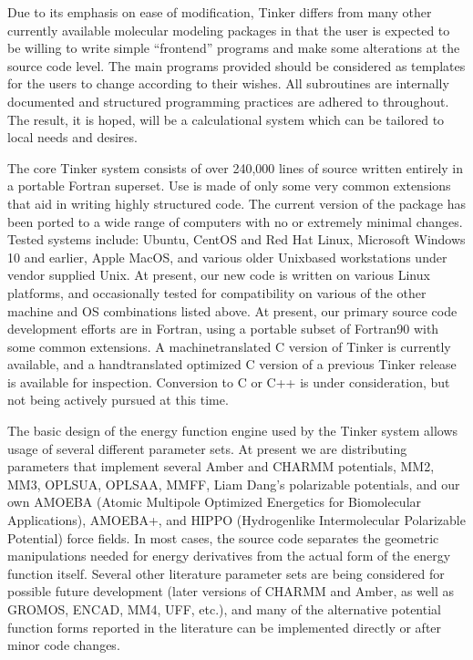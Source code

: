 \documentclass[letterpaper,11pt,english]{sphinxmanual}
\begin{document}
Due to its emphasis on ease of modification, Tinker differs from many other currently available molecular modeling packages in that the user is expected to be willing to write simple “front\sphinxhyphen{}end” programs and make some alterations at the source code level. The main programs provided should be considered as templates for the users to change according to their wishes. All subroutines are internally documented and structured programming practices are adhered to throughout. The result, it is hoped, will be a calculational system which can be tailored to local needs and desires.

The core Tinker system consists of over 240,000 lines of source written entirely in a portable Fortran superset. Use is made of only some very common extensions that aid in writing highly structured code. The current version of the package has been ported to a wide range of computers with no or extremely minimal changes. Tested systems include: Ubuntu, CentOS and Red Hat Linux, Microsoft Windows 10 and earlier, Apple MacOS, and various older Unix\sphinxhyphen{}based workstations under vendor supplied Unix. At present, our new code is written on various Linux platforms, and occasionally tested for compatibility on various of the other machine and OS combinations listed above. At present, our primary source code development efforts are in Fortran, using a portable subset of Fortran90 with some common extensions. A machine\sphinxhyphen{}translated C version of Tinker is currently available, and a hand\sphinxhyphen{}translated optimized C version of a previous Tinker release is available for inspection. Conversion to C or C++ is under consideration, but not being actively pursued at this time.

The basic design of the energy function engine used by the Tinker system allows usage of several different parameter sets. At present we are distributing parameters that implement several Amber and CHARMM potentials, MM2, MM3, OPLS\sphinxhyphen{}UA, OPLS\sphinxhyphen{}AA, MMFF, Liam Dang’s polarizable potentials, and our own AMOEBA (Atomic Multipole Optimized Energetics for Biomolecular Applications), AMOEBA+, and HIPPO (Hydrogen\sphinxhyphen{}like Intermolecular Polarizable Potential) force fields. In most cases, the source code separates the geometric manipulations needed for energy derivatives from the actual form of the energy function itself. Several other literature parameter sets are being considered for possible future development (later versions of CHARMM and Amber, as well as GROMOS, ENCAD, MM4, UFF, etc.), and many of the alternative potential function forms reported in the literature can be implemented directly or after minor code changes.
\end{document}
